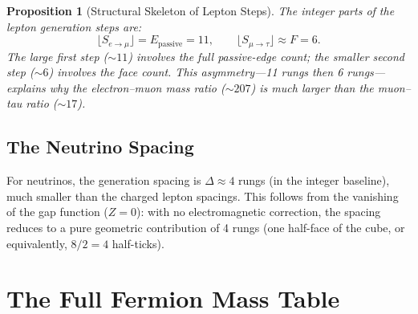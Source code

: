 \documentclass[12pt,a4paper]{article}
\newtheorem{proposition}[theorem]{Proposition}
\theoremstyle{definition}
\theoremstyle{remark}
\begin{document}
\begin{proposition}[Structural Skeleton of Lepton Steps]
\label{prop:step-skeleton}
The integer parts of the lepton generation steps are:
\begin{equation}
  \lfloor S_{e \to \mu} \rfloor = E_{\mathrm{passive}} = 11,
  \qquad
  \lfloor S_{\mu \to \tau} \rfloor \approx F = 6.
\end{equation}
The large first step ($\sim 11$) involves the full passive-edge
count; the smaller second step ($\sim 6$) involves the
face count.  This asymmetry---11 rungs then 6 rungs---explains
why the electron--muon mass ratio ($\sim 207$) is much larger
than the muon--tau ratio ($\sim 17$).
\end{proposition}

\subsection{The Neutrino Spacing}

For neutrinos, the generation spacing is $\Delta \approx 4$
rungs (in the integer baseline), much smaller than the charged
lepton spacings.  This follows from the vanishing of the gap
function ($Z = 0$): with no electromagnetic correction, the
spacing reduces to a pure geometric contribution of 4 rungs
(one half-face of the cube, or equivalently,
$8/2 = 4$ half-ticks).

\section{The Full Fermion Mass Table}
\label{sec:table}
\end{document}

